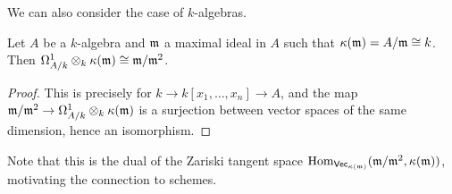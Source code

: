 We can also consider the case of $k$-algebras. 
\begin{corollary}\label{corr: residue fields}
    Let $A$ be a $k$-algebra and $\mathfrak{m}$ a maximal ideal in $A$ such that $\kappa(\mathfrak{m})=A/\mathfrak{m}\cong k$. Then $\Omega_{A/k}^{1}\otimes_{k}\kappa(\mathfrak{m})\cong\mathfrak{m}/\mathfrak{m}^{2}$. 
\end{corollary}
\begin{proof}
    This is precisely  for $k\to k[x_{1},\dots,x_{n}]\to A$, and the map $\mathfrak{m}/\mathfrak{m}^{2}\to\Omega^{1}_{A/k}\otimes_{k}\kappa(\mathfrak{m})$ is a surjection between vector spaces of the same dimension, hence an isomorphism. 
\end{proof}
Note that this is the dual of the Zariski tangent space $\mathrm{Hom}_{\mathsf{Vec}_{\kappa(\mathfrak{m})}}(\mathfrak{m}/\mathfrak{m}^{2},\kappa(\mathfrak{m}))$, motivating the connection to schemes. 